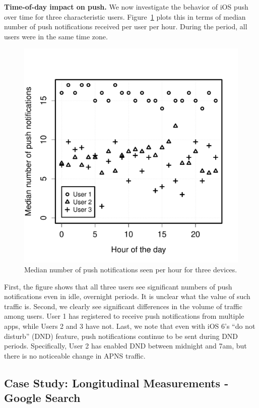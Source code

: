 \noindent\textbf{Time-of-day impact on push.} We now investigate 
the behavior of iOS push over time for three characteristic users. Figure~\ref{fig:pushHourly} 
plots this in terms of median number of push notifications received per 
user per hour. During the period, all users were in the same time zone.

\begin{figure}
\centering
        \includegraphics[width=\linewidth]{./plots/iosPushHourDistrib.pdf}
  \caption{Median number of push notifications seen per hour for three devices.}
  \label{fig:pushHourly}
\end{figure}

First, the figure shows that all three users see significant numbers of push 
notifications even in idle, overnight periods. It is unclear what the value of 
such traffic is. Second, we clearly see significant differences in the volume 
of traffic among users. User 1 has registered to receive push notifications 
from multiple apps, while Users 2 and 3 have not. Last, we note that even 
with iOS 6's ``do not disturb'' (DND) feature, push notifications continue to be 
sent during DND periods. Specifically, User 2 has enabled DND between 
midnight and 7am, but there is no noticeable change in APNS traffic.

\subsection{Case Study: Longitudinal Measurements - Google Search }
\label{sec:case-study-google}



